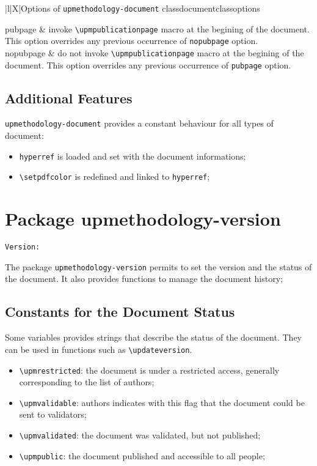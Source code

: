 \documentclass[book]{upmethodology-document}
\makeatletter
\let\VERversion\upm@package@version@ver
\makeatother
\begin{document}
\begin{mtable}{\linewidth}{2}{|l|X|}{Options of \texttt{upmethodology-document} class}{documentclassoptions}
\hline\hline

pubpage & invoke \texttt{{\textbackslash}upmpublicationpage} macro at the begining of the document. This option overrides any previous occurrence of \texttt{nopubpage} option. \\
\hline
nopubpage & do not invoke \texttt{{\textbackslash}upmpublicationpage} macro at the begining of the document. This option overrides any 
previous occurrence of \texttt{pubpage} option. \\

\hline
\end{mtable}

\section{Additional Features}

\texttt{upmethodology-document} provides a constant behaviour for all types of document:
\begin{itemize}
\item \texttt{hyperref} is loaded and set with the document informations;
\item \texttt{{\textbackslash}setpdfcolor} is redefined and linked to \texttt{hyperref};
\end{itemize}


\chapter{Package upmethodology-version}

\begin{center}
	\texttt{Version: \VERversion}
\end{center}

The package \texttt{upmethodology-version} permits to set the version and the status of the document. It also provides functions to manage the document history;

\section{Constants for the Document Status}

Some \LaTeXe\xspace variables provides strings that describe the status of the document. They can be used in functions such as \texttt{{\textbackslash}updateversion}.
\begin{itemize}
\item \texttt{{\textbackslash}upmrestricted}: the document is under a restricted access, generally corresponding to the list of authors;
\item \texttt{{\textbackslash}upmvalidable}: authors indicates with this flag that the document could be sent to validators;
\item \texttt{{\textbackslash}upmvalidated}: the document was validated, but not published;
\item \texttt{{\textbackslash}upmpublic}: the document published and accessible to all people;
\end{itemize}
\end{document}

